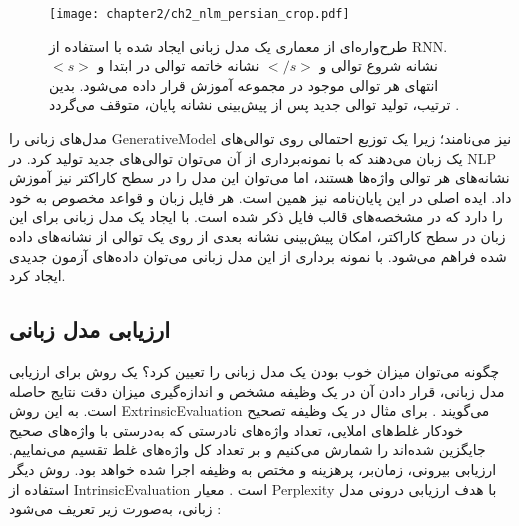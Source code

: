   \begin{figure}%
  	\centering
  	\texttt{[image: chapter2/ch2\_nlm\_persian\_crop.pdf]}
  	\caption[مدل زبانی عصبی مکرر]
  	{
  		طرح‌واره‌ای از معماری یک مدل زبانی ایجاد شده با استفاده از \gls{RNN}. $ <s> $ نشانه شروع توالی و $ </s> $ نشانه خاتمه توالی در ابتدا و انتهای هر توالی موجود در مجموعه آموزش قرار داده می‌شود. بدین ترتیب، تولید توالی جدید پس از پیش‌بینی نشانه پایان، متوقف می‌گردد \cite{Luong2016}.
  	}
  	\label{ch2_nlm_persian_crop.pdf}
  \end{figure}
  
  
  مدل‌های زبانی را \gls{GenerativeModel} نیز می‌نامند؛ زیرا یک توزیع احتمالی روی توالی‌های یک زبان می‌دهند که با نمونه‌‌برداری از آن می‌توان توالی‌های جدید تولید کرد. در \gls{NLP} نشانه‌های هر توالی واژه‌ها هستند، اما می‌توان این مدل را در سطح کاراکتر نیز آموزش داد. ایده اصلی در این پایان‌نامه نیز همین است. هر فایل زبان و قواعد مخصوص به خود را دارد که در مشخصه‌های قالب فایل ذکر شده است. با ایجاد یک مدل زبانی برای این زبان در سطح کاراکتر،  امکان پیش‌بینی نشانه بعدی از روی یک توالی از نشانه‌های داده شده فراهم می‌شود. با نمونه برداری از این مدل زبانی می‌توان داده‌های آزمون جدیدی ایجاد کرد.
 
 \subsection{ارزیابی مدل زبانی}
 چگونه می‌توان میزان خوب بودن یک مدل زبانی را تعیین کرد؟ یک روش برای ارزیابی مدل زبانی، قرار دادن آن در یک وظیفه مشخص و اندازه‌گیری میزان دقت نتایج حاصله است. به این روش‌ \gls{ExtrinsicEvaluation} می‌گویند
 \cite{Jurafsky2017}.
  برای مثال در یک وظیفه تصحیح خودکار غلط‌های املایی، تعداد واژه‌های نادرستی که به‌درستی با واژه‌های صحیح جایگزین شده‌اند را شمارش می‌کنیم و بر تعداد کل واژه‌های غلط تقسیم می‌نماییم. ارزیابی بیرونی، زمان‌بر، پرهزینه و مختص به وظیفه اجرا شده خواهد بود.  روش دیگر استفاده از \gls{IntrinsicEvaluation} است \cite{Jurafsky2017}. معیار \gls{Perplexity} با هدف ارزیابی  درونی مدل زبانی، به‌صورت زیر تعریف می‌شود \cite{mikolov2012statistical}:
  
